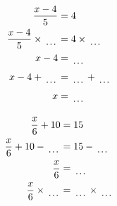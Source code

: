 \documentclass[12pt]{article}
\newcounter{minipagecount}
\begin{document}
\begin{multicols}{2}
\begin{minipage}[t]{0.45\textwidth}
    \raggedright %
    \begin{align*} %
        \frac{x - 4}{5} &= 4\\
        \frac{x - 4}{5} \times\dotuline{\hspace{5mm}} &= 4 \times\dotuline{\hspace{5mm}}\\
        x - 4 &= \dotuline{\hspace{5mm}}\\
        x - 4 + \dotuline{\hspace{5mm}} &= \dotuline{\hspace{5mm}} + \dotuline{\hspace{5mm}}\\
        x &= \dotuline{\hspace{5mm}}\\
    \end{align*}
\end{minipage} %
\noindent{(\theminipagecount)}\hspace{0.1mm} %
\begin{minipage}[t]{0.45\textwidth} %
    \vspace{-26pt}  %
    \raggedright %
    \begin{align*} %
        \frac{x}{6} + 10 &= 15\\
        \frac{x}{6} + 10 - \dotuline{\hspace{5mm}} &= 15 - \dotuline{\hspace{5mm}}\\
        \frac{x}{6} &= \dotuline{\hspace{5mm}}\\
        \frac{x}{6} \times\dotuline{\hspace{5mm}} &= \dotuline{\hspace{5mm}} \times\dotuline{\hspace{5mm}}\\

\end{align*}
\end{minipage}
\end{multicols}
\end{document}
